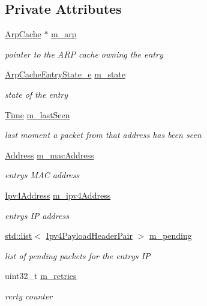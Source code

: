 \subsection*{Private Attributes}
\begin{DoxyCompactItemize}
\item 
\hyperlink{classns3_1_1ArpCache}{Arp\+Cache} $\ast$ \hyperlink{classns3_1_1ArpCache_1_1Entry_a0f8e4d6bcbc2f2c472c97f6118eaaaee}{m\+\_\+arp}
\begin{DoxyCompactList}\small\item\em pointer to the A\+RP cache owning the entry \end{DoxyCompactList}\item 
\hyperlink{classns3_1_1ArpCache_1_1Entry_a95a2d5d357f7306cf73e9efe4758a2ea}{Arp\+Cache\+Entry\+State\+\_\+e} \hyperlink{classns3_1_1ArpCache_1_1Entry_adb18d4ee6f4b15415822c18296a68497}{m\+\_\+state}
\begin{DoxyCompactList}\small\item\em state of the entry \end{DoxyCompactList}\item 
\hyperlink{classns3_1_1Time}{Time} \hyperlink{classns3_1_1ArpCache_1_1Entry_a1a9a1db28f30b03d60a246960236f891}{m\+\_\+last\+Seen}
\begin{DoxyCompactList}\small\item\em last moment a packet from that address has been seen \end{DoxyCompactList}\item 
\hyperlink{classns3_1_1Address}{Address} \hyperlink{classns3_1_1ArpCache_1_1Entry_a4fe4808f54104da1f8b7bfe00e7a7474}{m\+\_\+mac\+Address}
\begin{DoxyCompactList}\small\item\em entry\textquotesingle{}s M\+AC address \end{DoxyCompactList}\item 
\hyperlink{classns3_1_1Ipv4Address}{Ipv4\+Address} \hyperlink{classns3_1_1ArpCache_1_1Entry_a16100056dd506540b5d6343009a57e6b}{m\+\_\+ipv4\+Address}
\begin{DoxyCompactList}\small\item\em entry\textquotesingle{}s IP address \end{DoxyCompactList}\item 
\hyperlink{openflow-interface_8h_afd9bcfa176617760671b67580f536fa7}{std\+::list}$<$ \hyperlink{classns3_1_1ArpCache_ad018741a53ccc6cdb8b05fdd4873ef3d}{Ipv4\+Payload\+Header\+Pair} $>$ \hyperlink{classns3_1_1ArpCache_1_1Entry_a0f483e62340da794a052c71498fb0318}{m\+\_\+pending}
\begin{DoxyCompactList}\small\item\em list of pending packets for the entry\textquotesingle{}s IP \end{DoxyCompactList}\item 
uint32\+\_\+t \hyperlink{classns3_1_1ArpCache_1_1Entry_aa19aecb5fe13b4ec2814c80e8c0c6f11}{m\+\_\+retries}
\begin{DoxyCompactList}\small\item\em rerty counter \end{DoxyCompactList}\end{DoxyCompactItemize}


